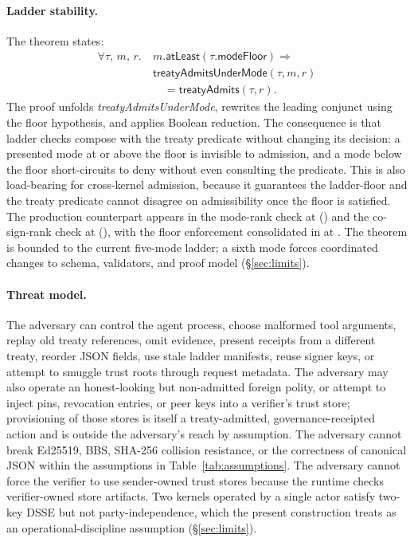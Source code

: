 \paragraph{Ladder stability.}
The theorem  states:
\begin{equation*}
\begin{aligned}
\forall \tau,\, m,\, r.\ & m.\mathsf{atLeast}(\tau.\mathsf{modeFloor}) \Rightarrow {} \\
  & \mathsf{treatyAdmitsUnderMode}(\tau,m,r) \\
  & \quad = \mathsf{treatyAdmits}(\tau,r).
\end{aligned}
\end{equation*}
The proof unfolds \emph{treatyAdmitsUnderMode}, rewrites the leading conjunct using the floor hypothesis, and applies Boolean reduction. The consequence is that ladder checks compose with the treaty predicate without changing its decision: a presented mode at or above the floor is invisible to admission, and a mode below the floor short-circuits to deny without even consulting the predicate. This is also load-bearing for cross-kernel admission, because it guarantees the ladder-floor and the treaty predicate cannot disagree on admissibility once the floor is satisfied. The production counterpart appears in the mode-rank check at  () and the co-sign-rank check at  (), with the floor enforcement consolidated in  at . The theorem is bounded to the current five-mode ladder; a sixth mode forces coordinated changes to schema, validators, and proof model (\S\ref{sec:limits}).

\paragraph{Threat model.}
The adversary can control the agent process, choose malformed tool arguments, replay old treaty references, omit evidence, present receipts from a different treaty, reorder JSON fields, use stale ladder manifests, reuse signer keys, or attempt to smuggle trust roots through request metadata. The adversary may also operate an honest-looking but non-admitted foreign polity, or attempt to inject pins, revocation entries, or peer keys into a verifier's trust store; provisioning of those stores is itself a treaty-admitted, governance-receipted action and is outside the adversary's reach by assumption. The adversary cannot break Ed25519, BBS, SHA-256 collision resistance, or the correctness of canonical JSON within the assumptions in Table~\ref{tab:assumptions}. The adversary cannot force the verifier to use sender-owned trust stores because the runtime checks verifier-owned store artifacts. Two kernels operated by a single actor satisfy two-key DSSE but not party-independence, which the present construction treats as an operational-discipline assumption (\S\ref{sec:limits}).

